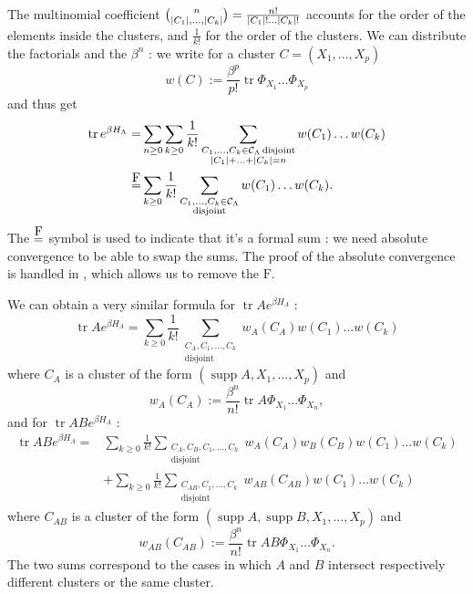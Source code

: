 \documentclass{article}
\DeclarePairedDelimiter\abs{\lvert}{\rvert}
\DeclareMathOperator{\disj}{disjoint}
\DeclareMathOperator{\tr}{tr}
\DeclareMathOperator{\supp}{supp}
\newcommand\formeq{\stackrel{\mathclap{\normalfont\mbox{F}}}{=}}
\begin{document}
    The multinomial coefficient $\binom{n}{\abs{C_1},\ldots,\abs{C_k}}=\frac{n!}{\abs{C_1}!\ldots\abs{C_k}!}$ accounts for the order of the elements inside the clusters, and $\frac{1}{k!}$ for the order of the clusters.
    We can distribute the factorials and the $\beta^n$ : we write for a cluster $C=(X_1,\ldots,X_p)$
    $$
    w(C):=\frac {\beta^p}{p!}\tr \Phi_{X_1}\ldots\Phi_{X_p}
    $$
    and thus get 
    \begin{align*}
        \tr e^{\beta H_\Lambda}=&\sum_{n\geq0}\sum_{k\geq 0}\frac 1{k!}\sum_{\substack{C_1,\ldots,C_k\in\mathcal C_\Lambda \disj\\\abs{C_1}+\ldots+\abs{C_k}=n}}w(C_1)\ldots w(C_k)\\
        \formeq&\sum_{k\geq 0}\frac 1{k!} \sum_{\substack{C_1,\ldots,C_k\in\mathcal C_\Lambda\\\disj}}w(C_1)\ldots w(C_k).
    \end{align*}
    The $\formeq$ symbol is used to indicate that it’s a formal sum : we need absolute convergence to be able to swap the sums. 
    The proof of the absolute convergence is handled in \cite{friedliChapterClusterExpansion2017}, which allows us to remove the $\text{F}$.
    
    We can obtain a very similar formula for $\tr Ae^{\beta H_\Lambda}$ :
    \begin{equation*}
        \tr Ae^{\beta H_\Lambda}=\sum_{k\geq 0}\frac 1 {k!} \sum_{\substack{C_A,C_1,\ldots,C_k\\\disj}}w_A(C_A)w(C_1)\ldots w(C_k)
    \end{equation*}
    where $C_A$ is a cluster of the form $(\supp A,X_1,\ldots,X_p)$ and $$
        w_A(C_A):=\frac{\beta^n}{n!}\tr A\Phi_{X_1}\ldots\Phi_{X_n},
    $$
    and for $\tr ABe^{\beta H_\Lambda}$ :\begin{align*}
        \tr ABe^{\beta H_\Lambda}=&\sum_{k\geq 0}\frac 1 {k!} \sum_{\substack{C_A,C_B,C_1,\ldots,C_k\\\disj}}w_A(C_A)w_B(C_B)w(C_1)\ldots w(C_k)\\
        &+\sum_{k\geq 0}\frac 1 {k!} \sum_{\substack{C_{AB},C_1,\ldots,C_k\\\disj}}w_{AB}(C_{AB})w(C_1)\ldots w(C_k)
        \end{align*}
        where $C_{AB}$ is a cluster of the form $(\supp A, \supp B,X_1,\ldots,X_p)$ and
        $$
        w_{AB}(C_{AB}):=\frac{\beta^n}{n!}\tr AB\Phi_{X_1}\ldots\Phi_{X_n}.
        $$
        The two sums correspond to the cases in which $A$ and $B$ intersect respectively different clusters or the same cluster.
     
\end{document}
